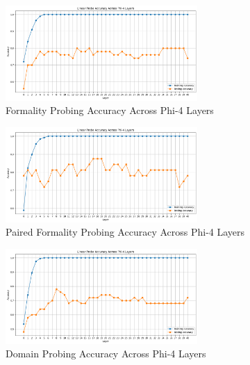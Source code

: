 \documentclass[twocolumn]{article}
\begin{document}
\onecolumn
\begin{figure}
    \centering
    \includegraphics[width=0.65\textwidth]{figures/1_formality.png}
    \caption{Formality Probing Accuracy Across Phi-4 Layers}
    \label{fig:formality-accuracy}
\end{figure}
\begin{figure}
    \centering
    \includegraphics[width=0.65\textwidth]{figures/2_pairedFormality.png}
    \caption{Paired Formality Probing Accuracy Across Phi-4 Layers}
    \label{fig:paired-formality-accuracy}
\end{figure}
\begin{figure}
    \centering
    \includegraphics[width=0.65\textwidth]{figures/3_domain.png}
    \caption{Domain Probing Accuracy Across Phi-4 Layers}
    \label{fig:domain-accuracy}
\end{figure}
\twocolumn

\onecolumn
\end{document}
